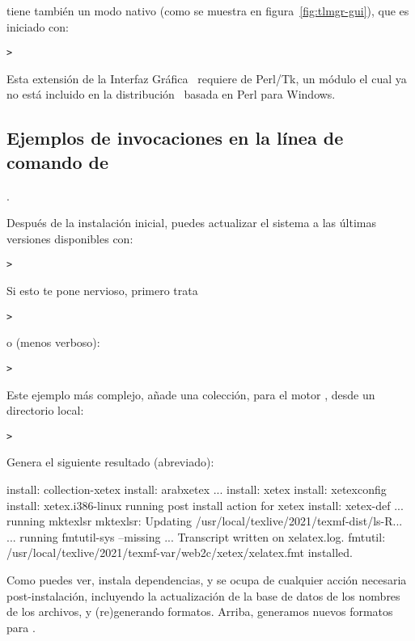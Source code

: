 \documentclass{article}
\begin{document}
 tiene también un modo nativo \GUI{}
(como se muestra en figura~\ref{fig:tlmgr-gui}), que es iniciado con:
\begin{alltt}
> 
\end{alltt}

Esta extensión de la Interfaz Gráfica \GUI\ requiere de
Perl/Tk, un módulo el cual ya no está incluido en la
distribución \TL\ basada en Perl para Windows.

\subsection{Ejemplos de invocaciones en la línea de comando de
}. 

Después de la instalación inicial, puedes actualizar el sistema a las
últimas versiones disponibles con: 
\begin{alltt}
> 
\end{alltt}
Si esto te pone nervioso, primero trata
\begin{alltt}
> 
\end{alltt}
o (menos verboso):
\begin{alltt}
> 
\end{alltt}

Este ejemplo más complejo, añade una colección, para el motor \XeTeX,
desde un directorio local:

\begin{alltt}
> 
\end{alltt}
Genera el siguiente resultado (abreviado):
\begin{fverbatim}
install: collection-xetex
install: arabxetex
...
install: xetex
install: xetexconfig
install: xetex.i386-linux
running post install action for xetex
install: xetex-def
...
running mktexlsr
mktexlsr: Updating /usr/local/texlive/2021/texmf-dist/ls-R...
...
running fmtutil-sys --missing
...
Transcript written on xelatex.log.
fmtutil: /usr/local/texlive/2021/texmf-var/web2c/xetex/xelatex.fmt installed.
\end{fverbatim}

Como puedes ver,  instala dependencias, y se ocupa de
cualquier acción necesaria post-instalación, incluyendo la
actualización de la base de datos de los nombres de los archivos, y
(re)generando formatos. Arriba, generamos nuevos formatos para \XeTeX.
\end{document}
